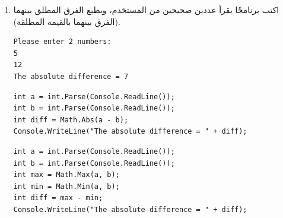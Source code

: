\documentclass[14pt]{extarticle}
\begin{document}
\begin{enumerate}[itemsep=3em]
    \item
    اكتب برنامجًا يقرأ عددين صحيحين من المستخدم، ويطبع الفرق المطلق بينهما (الفرق بينهما بالقيمة المطلقة).
    \ifdetailed
    \begin{boxExample}
    \begin{english}
    \begin{verbatim}
Please enter 2 numbers:
5
12
The absolute difference = 7
    \end{verbatim}
    \end{english}
    \end{boxExample}
    \ifwithsols
    \begin{boxSolution}[1]
    \begin{english}
    \begin{verbatim}
int a = int.Parse(Console.ReadLine());
int b = int.Parse(Console.ReadLine());
int diff = Math.Abs(a - b);
Console.WriteLine("The absolute difference = " + diff);
    \end{verbatim}
    \end{english}
    \end{boxSolution}
    \begin{boxSolution}[2]
    \begin{english}
    \begin{verbatim}
int a = int.Parse(Console.ReadLine());
int b = int.Parse(Console.ReadLine());
int max = Math.Max(a, b);
int min = Math.Min(a, b);
int diff = max - min;
Console.WriteLine("The absolute difference = " + diff);
    \end{verbatim}
    \end{english}
    \end{boxSolution}
    \fi
\fi


\end{enumerate}
\end{document}
